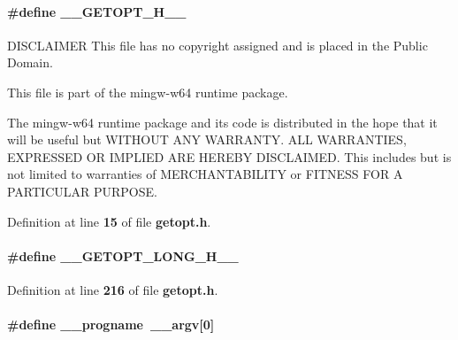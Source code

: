 \paragraph[{\+\_\+\+\_\+\+G\+E\+T\+O\+P\+T\+\_\+\+H\+\_\+\+\_\+}]{\setlength{\rightskip}{0pt plus 5cm}\#define \+\_\+\+\_\+\+G\+E\+T\+O\+P\+T\+\_\+\+H\+\_\+\+\_\+}\label{limesuite-dev_2external_2msvc_2getopt_8h_ab74b871ab5bc8fdcf0977a911c46f0b4}


D\+I\+S\+C\+L\+A\+I\+M\+ER This file has no copyright assigned and is placed in the Public Domain. 

This file is part of the mingw-\/w64 runtime package.

The mingw-\/w64 runtime package and its code is distributed in the hope that it will be useful but W\+I\+T\+H\+O\+UT A\+NY W\+A\+R\+R\+A\+N\+TY. A\+LL W\+A\+R\+R\+A\+N\+T\+I\+ES, E\+X\+P\+R\+E\+S\+S\+ED OR I\+M\+P\+L\+I\+ED A\+RE H\+E\+R\+E\+BY D\+I\+S\+C\+L\+A\+I\+M\+ED. This includes but is not limited to warranties of M\+E\+R\+C\+H\+A\+N\+T\+A\+B\+I\+L\+I\+TY or F\+I\+T\+N\+E\+SS F\+OR A P\+A\+R\+T\+I\+C\+U\+L\+AR P\+U\+R\+P\+O\+SE. 

Definition at line {\bf 15} of file {\bf getopt.\+h}.

\paragraph[{\+\_\+\+\_\+\+G\+E\+T\+O\+P\+T\+\_\+\+L\+O\+N\+G\+\_\+\+H\+\_\+\+\_\+}]{\setlength{\rightskip}{0pt plus 5cm}\#define \+\_\+\+\_\+\+G\+E\+T\+O\+P\+T\+\_\+\+L\+O\+N\+G\+\_\+\+H\+\_\+\+\_\+}\label{limesuite-dev_2external_2msvc_2getopt_8h_ad4e526cd7d8899b3032ecde2a6a9fa68}


Definition at line {\bf 216} of file {\bf getopt.\+h}.

\paragraph[{\+\_\+\+\_\+progname}]{\setlength{\rightskip}{0pt plus 5cm}\#define \+\_\+\+\_\+progname~\+\_\+\+\_\+argv[0]}\label{limesuite-dev_2external_2msvc_2getopt_8h_a41c2f9db0a7e23392fbbebb1d1c185ec}


